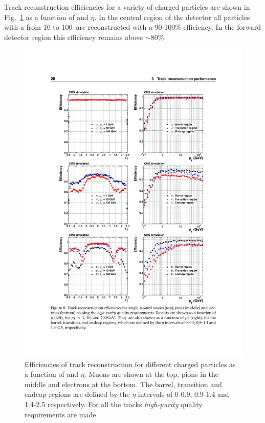 Track reconstruction efficiencies for a variety of charged particles
are shown in Fig.~\ref{fig:tracks_reco} as a function of \pt and
$\eta$. In the central region of the detector all particles with a \pt
from 10 to 100~\gev are reconstructed with a 90-100\% efficiency. In the
forward detector region this efficiency remains above $\sim80\%$.

\begin{figure}
\begin{center}
\includegraphics[width=0.8\linewidth]{figs/reconstruction/trackerPerformance} \end{center}
\caption{Efficiencies of track reconstruction for different charged
particles as a function of \pt and $\eta$. Muons are shown at the top,
pions in the middle and electrons at the bottom. The barrel,
transition and endcap regions are defined by the $\eta$ intervals of
0-0.9, 0.9-1.4 and 1.4-2.5 respectively.  For all the tracks
\emph{high-purity} quality requirements are made
\cite{Chatrchyan:2014fea}}
\label{fig:tracks_reco} \end{figure}

